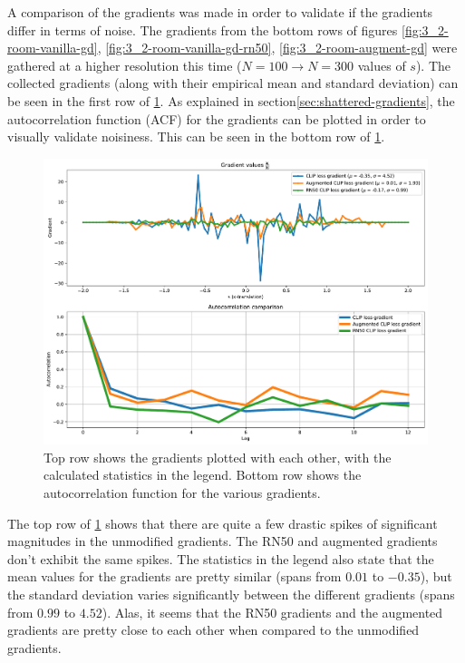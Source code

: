 A comparison of the gradients was made in order to validate if the gradients differ in terms of noise. The gradients from the bottom rows of figures \ref{fig:3_2-room-vanilla-gd}, \ref{fig:3_2-room-vanilla-gd-rn50}, \ref{fig:3_2-room-augment-gd} were gathered at a higher resolution this time ($N=100 \rightarrow N=300$ values of $s$). The collected gradients (along with their empirical mean and standard deviation) can be seen in the first row of \ref{fig:3_2-gradients-acf}. As explained in section\ref{sec:shattered-gradients}, the autocorrelation function (ACF) for the gradients can be plotted in order to visually validate noisiness. This can be seen in the bottom row of \ref{fig:3_2-gradients-acf}.
\begin{figure}[H]
    \centering
    \includegraphics[width=1.0\textwidth]{figures/3_2-gradients-acf.pdf}
    \caption{Top row shows the gradients plotted with each other, with the calculated statistics in the legend. Bottom row shows the autocorrelation function for the various gradients.}
    \label{fig:3_2-gradients-acf}
\end{figure}

The top row of \ref{fig:3_2-gradients-acf} shows that there are quite a few drastic spikes of significant magnitudes in the unmodified gradients. The RN50 and augmented gradients don't exhibit the same spikes. The statistics in the legend also state that the mean values for the gradients are pretty similar (spans from $0.01$ to $-0.35$), but the standard deviation varies significantly between the different gradients (spans from $0.99$ to $4.52$). Alas, it seems that the RN50 gradients and the augmented gradients are pretty close to each other when compared to the unmodified gradients.

